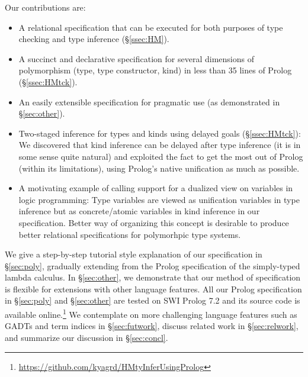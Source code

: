 Our contributions are:
\begin{itemize}\vspace*{-1ex}
\item A relational specification that can be executed for
	both purposes of type checking and type inference (\S\ref{ssec:HM}).
\item A succinct and declarative specification for several dimensions of
	polymorphism (type, type constructor, kind) in less than 35 lines
	of Prolog (\S\ref{ssec:HMtck}).
\item An easily extensible specification for pragmatic use
	(as demonstrated in \S\ref{sec:other}).
\item Two-staged inference for types and kinds using delayed goals
	(\S\ref{ssec:HMtck}):
We discovered that kind inference can be delayed after type inference
(it is in some sense quite natural) and exploited the fact to get the
most out of Prolog (within its limitations), using Prolog's
native unification as much as possible.
\item A motivating example of calling support for a dualized
	view on variables in logic programming:
Type variables are viewed as unification variables
in type inference but as concrete/atomic variables
in kind inference in our specification.
Better way of organizing this concept is desirable
to produce better relational specifications for polymorhpic type systems.
\end{itemize}

We give a step-by-step tutorial style explanation of our specification in
\S\ref{sec:poly}, gradually extending from the Prolog specification of
the simply-typed lambda calculus. In \S\ref{sec:other}, we demonstrate
that our method of specification is flexible for extensions with
other language features. All our Prolog specification in \S\ref{sec:poly}
and \S\ref{sec:other} are tested on SWI Prolog 7.2 and its source code is
available online.\footnote{
	\url{https://github.com/kyagrd/HMtyInferUsingProlog} }\label{githubURL}
We contemplate on more challenging language features such as GADTs and
term indices in \S\ref{sec:futwork}, discuss related work in
\S\ref{sec:relwork}, and summarize our discussion in \S\ref{sec:concl}.

